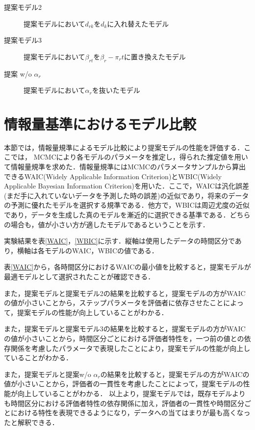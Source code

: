 \documentclass[a4paper,11pt,oneside,openany]{jsbook}
\begin{document}
\begin{description}
\item [提案モデル2]提案モデルにおいて$d_{rk}$を$d_k$に入れ替えたモデル
\item[提案モデル3]提案モデルにおいて$\beta_{rt}$を$\beta_{r} - \pi_{r}t$に置き換えたモデル
\item[提案 w/o $\alpha_r$]提案モデルにおいて$\alpha_r$を抜いたモデル
\end{description}

\section{情報量基準におけるモデル比較}

本節では，情報量規準によるモデル比較により提案モデルの性能を評価する．ここでは， MCMCにより各モデルのパラメータを推定し，得られた推定値を用いて情報量規準を求めた．情報量規準にはMCMCのパラメータサンプルから算出できるWAIC(Widely Applicable Information Criterion)とWBIC(Widely Applicable Bayesian Information Criterion)を用いた．ここで，WAICは汎化誤差(まだ手に入れていないデータを予測した時の誤差)の近似であり，将来のデータの予測に優れたモデルを選択する規準である．他方で，WBICは周辺尤度の近似であり，データを生成した真のモデルを漸近的に選択できる基準である．どちらの場合も，値が小さい方が適したモデルであるということを示す．

実験結果を表\ref{WAIC}，\ref{WBIC}に示す．縦軸は使用したデータの時間区分であり，横軸は各モデルのWAIC，WBICの値である．

表\ref{WAIC}から，各時間区分におけるWAICの最小値を比較すると，提案モデルが最適モデルとして選択されたことが確認できる．

また，提案モデルと提案モデル2の結果を比較すると，提案モデルの方がWAICの値が小さいことから，ステップパラメータを評価者に依存させたことによって，提案モデルの性能が向上していることがわかる．

また，提案モデルと提案モデル3の結果を比較すると，提案モデルの方がWAICの値が小さいことから，時間区分ごとにおける評価者特性を，一つ前の値との依存関係を考慮したパラメータで表現したことにより，提案モデルの性能が向上していることがわかる．

また，提案モデルと提案w/o $\alpha_r$の結果を比較すると，提案モデルの方がWAICの値が小さいことから，評価者の一貫性を考慮したことによって，提案モデルの性能が向上していることがわかる．
以上より，提案モデルでは，既存モデルよりも時間区分における評価者特性の依存関係に加え，評価者の一貫性や時間区分ごとにおける特性を表現できるようになり，データへの当てはまりが最も高くなったと解釈できる．
\end{document}
